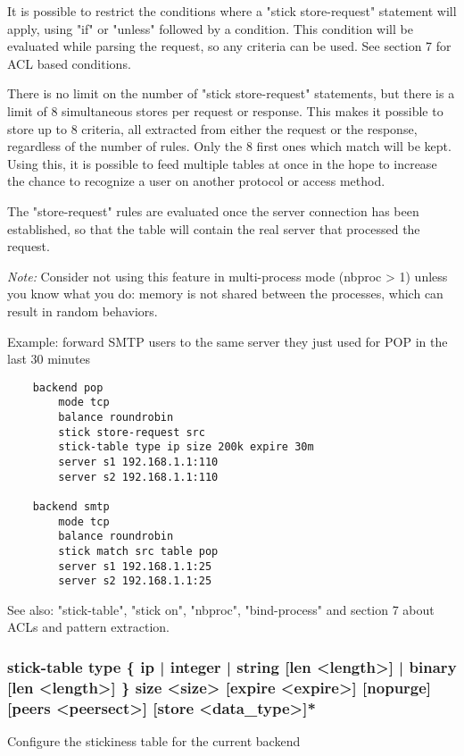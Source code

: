   It is possible to restrict the conditions where a "stick store-request"
  statement will apply, using "if" or "unless" followed by a condition. This
  condition will be evaluated while parsing the request, so any criteria can be
  used. See section 7 for ACL based conditions.

  There is no limit on the number of "stick store-request" statements, but
  there is a limit of 8 simultaneous stores per request or response. This
  makes it possible to store up to 8 criteria, all extracted from either the
  request or the response, regardless of the number of rules. Only the 8 first
  ones which match will be kept. Using this, it is possible to feed multiple
  tables at once in the hope to increase the chance to recognize a user on
  another protocol or access method.

  The "store-request" rules are evaluated once the server connection has been
  established, so that the table will contain the real server that processed
  the request.

  \emph{Note:} Consider not using this feature in multi-process mode (nbproc > 1)
         unless you know what you do: memory is not shared between the
         processes, which can result in random behaviors.

  Example: forward SMTP users to the same server they just used for POP in the last 30 minutes
  \begin{verbatim}
    backend pop
        mode tcp
        balance roundrobin
        stick store-request src
        stick-table type ip size 200k expire 30m
        server s1 192.168.1.1:110
        server s2 192.168.1.1:110

    backend smtp
        mode tcp
        balance roundrobin
        stick match src table pop
        server s1 192.168.1.1:25
        server s2 192.168.1.1:25
   \end{verbatim}

  See also: "stick-table", "stick on", "nbproc", "bind-process" and section 7
             about ACLs and pattern extraction.

\subsubsection[stick-table type]{stick-table type \{ ip | integer | string [len <length>] | binary [len <length>] \} size <size> [expire <expire>] [nopurge] [peers <peersect>] [store <data\_type>]*}

  Configure the stickiness table for the current backend

